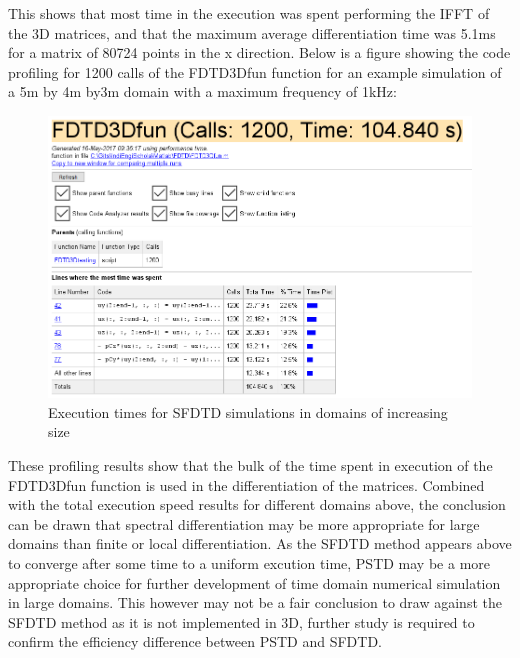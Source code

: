 This shows that most time in the execution was spent performing the IFFT of the 3D matrices, and that the maximum average differentiation time was 5.1ms for a matrix of 80724 points in the x direction. Below is a figure showing the code profiling for 1200 calls of the FDTD3Dfun function for an example simulation of a 5m by 4m by3m domain with a maximum frequency of 1kHz:\\
\begin{figure}[H]
\centering
  \includegraphics[width=\textwidth]{./graphics/fdtdfunctioncodeprofile.png}
  \caption{Execution times for SFDTD simulations in domains of increasing size}
\end{figure}

These profiling results show that the bulk of the time spent in execution of the FDTD3Dfun function is used in the differentiation of the matrices. Combined with the total execution speed results for different domains above, the conclusion can be drawn that spectral differentiation may be more appropriate for large domains than finite or local differentiation. As the SFDTD method appears above to converge after some time to a uniform excution time, PSTD may be a more appropriate choice for further development of time domain numerical simulation in large domains. This however may not be a fair conclusion to draw against the SFDTD method as it is not implemented in 3D, further study is required to confirm the efficiency difference between PSTD and SFDTD.

